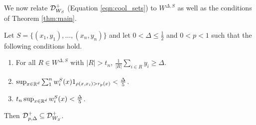 We now relate ${\mathcal D}_{W_S}^+$ (Equation \ref{eqn:cool_sets}) to $W^{\Delta, S}$ as well as the conditions of Theorem \ref{thm:main}.

\begin{lem}\label{lem:proving_it_works}
Let $S = \{(x_1, y_1), \dots, (x_n, y_n)\}$ and let $0 < \Delta \leq \frac{1}{2}$ and $0 < p < 1$ such that the following conditions hold. 
\begin{enumerate}
	\item For all $R \in W^{\Delta, S}$ with $|R| > t_n$, $\frac{1}{|R|} \sum_{i \in R} y_i \geq \Delta$. 
	\item $\sup_{x \in \mathbb R^d} \sum_1^n w_i^S(x)1_{\rho(x, x_i) > r_p(x)} < \frac{\Delta}{5}$.
	\item $t_n\sup_{x \in \mathbb R^d} w_i^S(x) < \frac{\Delta}{5}$. 
\end{enumerate}
Then ${\mathcal D}_{p, \Delta}^+ \subseteq {\mathcal D}_{W_S}^+$. 
\end{lem}

